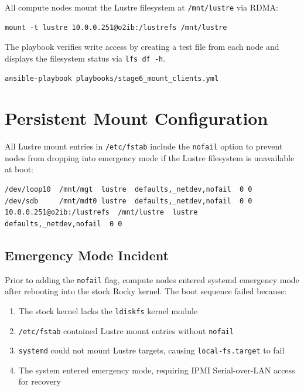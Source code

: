All compute nodes mount the Lustre filesystem at \texttt{/mnt/lustre} via RDMA:

\begin{verbatim}
mount -t lustre 10.0.0.251@o2ib:/lustrefs /mnt/lustre
\end{verbatim}

The playbook verifies write access by creating a test file from each node and displays the filesystem status via \texttt{lfs df -h}.

\begin{verbatim}
ansible-playbook playbooks/stage6_mount_clients.yml
\end{verbatim}

\section{Persistent Mount Configuration}

All Lustre mount entries in \texttt{/etc/fstab} include the \texttt{nofail} option to prevent nodes from dropping into emergency mode if the Lustre filesystem is unavailable at boot:

\begin{verbatim}
/dev/loop10  /mnt/mgt  lustre  defaults,_netdev,nofail  0 0
/dev/sdb     /mnt/mdt0 lustre  defaults,_netdev,nofail  0 0
10.0.0.251@o2ib:/lustrefs  /mnt/lustre  lustre  defaults,_netdev,nofail  0 0
\end{verbatim}

\subsection{Emergency Mode Incident}

Prior to adding the \texttt{nofail} flag, compute nodes entered systemd emergency mode after rebooting into the stock Rocky kernel. The boot sequence failed because:

\begin{enumerate}
    \item The stock kernel lacks the \texttt{ldiskfs} kernel module
    \item \texttt{/etc/fstab} contained Lustre mount entries without \texttt{nofail}
    \item \texttt{systemd} could not mount Lustre targets, causing \texttt{local-fs.target} to fail
    \item The system entered emergency mode, requiring IPMI Serial-over-LAN access for recovery
\end{enumerate}

